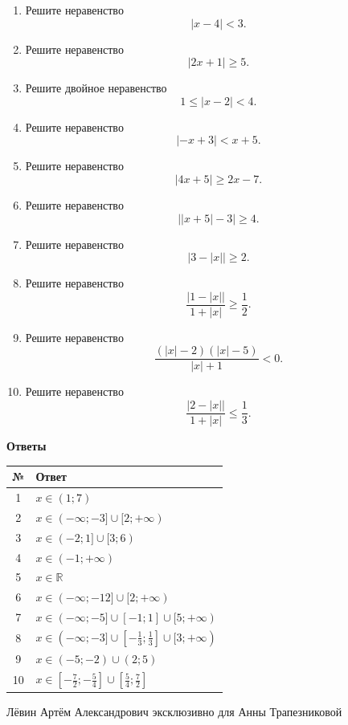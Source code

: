 \documentclass[a4paper,12pt]{article}
\newcommand{\R}{\mathbb{R}}
\begin{document}
\begin{enumerate}
  \item Решите неравенство
  \[
  |x-4|<3.
  \]

  \item Решите неравенство
  \[
  |2x+1|\ge5.
  \]

  \item Решите двойное неравенство
  \[
  1\le|x-2|<4.
  \]

  \item Решите неравенство
  \[
  |-x+3|<x+5.
  \]

  \item Решите неравенство
  \[
  |4x+5|\ge2x-7.
  \]

  \item Решите неравенство
  \[
  \bigl||x+5|-3\bigr|\ge4.
  \]

  \item Решите неравенство
  \[
  |3-|x||\ge2.
  \]

  \item Решите неравенство
  \[
  \frac{|1-|x||}{1+|x|}\ge\frac12.
  \]

  \item Решите неравенство
  \[
  \frac{(|x|-2)(|x|-5)}{|x|+1}<0.
  \]

  \item Решите неравенство
  \[
  \frac{|2-|x||}{1+|x|}\le\frac13.
  \]
\end{enumerate}

\clearpage

\thispagestyle{plain}
\begin{center}
{\Large\bfseries\color{darkaccent}Ответы}\par
\vspace{6mm}
\end{center}

\renewcommand{\arraystretch}{1.35}
\begin{tabularx}{\linewidth}{@{}cX@{}}
\toprule
\textbf{№} & \textbf{Ответ} \\
\midrule
1 & $x\in(1;7)$ \\
2 & $x\in(-\infty;-3]\cup[2;+\infty)$ \\
3 & $x\in(-2;1]\cup[3;6)$ \\
4 & $x\in(-1;+\infty)$ \\
5 & $x\in\R$ \\
6 & $x\in(-\infty;-12]\cup[2;+\infty)$ \\
7 & $x\in(-\infty;-5]\cup[-1;1]\cup[5;+\infty)$ \\
8 & $x\in(-\infty;-3]\cup\left[-\frac13;\frac13\right]\cup[3;+\infty)$ \\
9 & $x\in(-5;-2)\cup(2;5)$ \\
10 & $x\in\left[-\frac72;-\frac54\right]\cup\left[\frac54;\frac72\right]$ \\
\bottomrule
\end{tabularx}

\vfill
{\small\color{softgray}Лёвин Артём Александрович эксклюзивно для Анны Трапезниковой}\par
\end{document}
